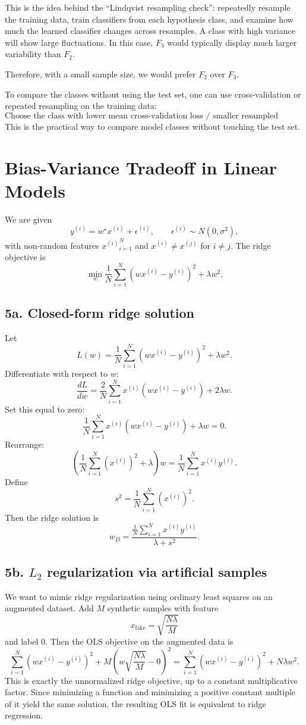 \documentclass[11pt]{article}
\begin{document}
This is the idea behind the “Lindqvist resampling check”: repeatedly resample the training data, train classifiers from each hypothesis class, and examine how much the learned classifier changes across resamples. A class with high variance will show large fluctuations. In this case, $F_3$ would typically display much larger variability than $F_2$.

Therefore, with a small sample size, we would prefer $F_2$ over $F_3$.

To compare the classes without using the test set, one can use cross-validation or repeated resampling on the training data:
\[
\text{Choose the class with lower mean cross-validation loss / smaller resampled variability.}
\]
This is the practical way to compare model classes without touching the test set.

\section{Bias-Variance Tradeoff in Linear Models}

We are given
\[
 y^{(i)} = w^\star x^{(i)} + \epsilon^{(i)},
\qquad \epsilon^{(i)}\sim N(0,\sigma^2),
\]
with non-random features ${x^{(i)}}_{i=1}^N$ and $x^{(i)}\ne x^{(j)}$ for $i\ne j$.
The ridge objective is
\[
\min_w \frac1N \sum_{i=1}^N (wx^{(i)}-y^{(i)})^2 + \lambda w^2.
\]

\subsection*{5a. Closed-form ridge solution}

Let
\[
L(w)=\frac1N\sum_{i=1}^N (wx^{(i)}-y^{(i)})^2 + \lambda w^2.
\]
Differentiate with respect to $w$:
\[
\frac{dL}{dw} = \frac2N\sum_{i=1}^N x^{(i)}(wx^{(i)}-y^{(i)}) + 2\lambda w.
\]
Set this equal to zero:
\[
\frac1N\sum_{i=1}^N x^{(i)}(wx^{(i)}-y^{(i)}) + \lambda w = 0.
\]
Rearrange:
\[
\left(\frac1N\sum_{i=1}^N (x^{(i)})^2 + \lambda\right) w = \frac1N\sum_{i=1}^N x^{(i)}y^{(i)}.
\]
Define
\[
 s^2 = \frac1N\sum_{i=1}^N (x^{(i)})^2.
\]
Then the ridge solution is
\[
\boxed{w_D = \frac{\frac1N\sum_{i=1}^N x^{(i)}y^{(i)}}{\lambda+s^2}.}
\]

\subsection*{5b. $L_2$ regularization via artificial samples}

We want to mimic ridge regularization using ordinary least squares on an augmented dataset.
Add $M$ synthetic samples with feature
\[
 x_{\text{fake}} = \sqrt{\frac{N\lambda}{M}}
\]
and label $0$.
Then the OLS objective on the augmented data is
\[
\sum_{i=1}^N (wx^{(i)}-y^{(i)})^2 + M\left(w\sqrt{\frac{N\lambda}{M}}-0\right)^2
= \sum_{i=1}^N (wx^{(i)}-y^{(i)})^2 + N\lambda w^2.
\]
This is exactly the unnormalized ridge objective, up to a constant multiplicative factor. Since minimizing a function and minimizing a positive constant multiple of it yield the same solution, the resulting OLS fit is equivalent to ridge regression.
\end{document}
